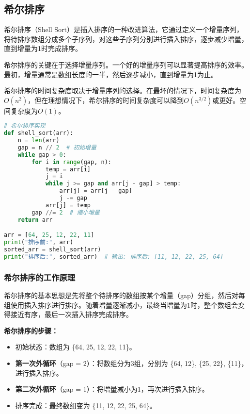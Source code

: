 \documentclass{article}
\begin{document}
\subsection{希尔排序}
希尔排序（Shell Sort）是插入排序的一种改进算法，它通过定义一个增量序列，将待排序数组分成多个子序列，对这些子序列分别进行插入排序，逐步减少增量，直到增量为1时完成排序。

希尔排序的关键在于选择增量序列。一个好的增量序列可以显著提高排序的效率。最初，增量通常是数组长度的一半，然后逐步减小，直到增量为1为止。

希尔排序的时间复杂度取决于增量序列的选择。在最坏的情况下，时间复杂度为$O(n^2)$，但在理想情况下，希尔排序的时间复杂度可以降到$O(n^{3/2})$或更好。空间复杂度为$O(1)$。

\begin{lstlisting}[language=Python,caption=希尔排序实现]
# 希尔排序实现
def shell_sort(arr):
    n = len(arr)
    gap = n // 2  # 初始增量
    while gap > 0:
        for i in range(gap, n):
            temp = arr[i]
            j = i
            while j >= gap and arr[j - gap] > temp:
                arr[j] = arr[j - gap]
                j -= gap
            arr[j] = temp
        gap //= 2  # 缩小增量
    return arr

arr = [64, 25, 12, 22, 11]
print("排序前:", arr)
sorted_arr = shell_sort(arr)
print("排序后:", sorted_arr)  # 输出: 排序后: [11, 12, 22, 25, 64]
\end{lstlisting}

\subsubsection{希尔排序的工作原理}
希尔排序的基本思想是先将整个待排序的数组按某个增量（gap）分组，然后对每组使用插入排序进行排序。随着增量逐渐减小，最终当增量为1时，整个数组会变得接近有序，最后一次插入排序完成排序。

\noindent
\textbf{希尔排序的步骤：}
\begin{itemize}
    \item 初始状态：数组为 \{64, 25, 12, 22, 11\}。
    \item \textbf{第一次外循环}（gap = 2）：将数组分为3组，分别为 \{64, 12\}, \{25, 22\}, \{11\}，进行插入排序。
    \item \textbf{第二次外循环}（gap = 1）：将增量减小为1，再次进行插入排序。
    \item 排序完成：最终数组变为 \{11, 12, 22, 25, 64\}。
\end{itemize}
\end{document}
